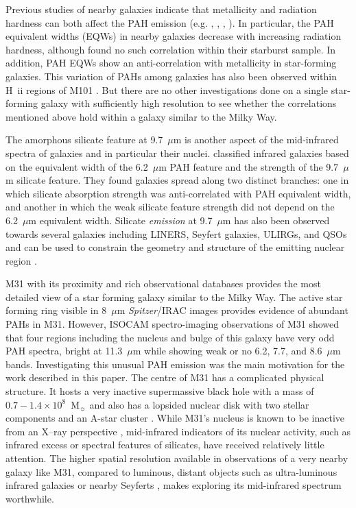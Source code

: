\documentclass[useAMS,usenatbib,a4paper]{mn2e}
\begin{document}
Previous studies of nearby galaxies indicate that metallicity and radiation hardness can both affect the PAH emission (e.g. \citealt{Madden:00}, \citealt{Beirao:06}, \citealt{Engelbracht_2008}, \citealt{Munoz:09}). In particular, the PAH equivalent widths (EQWs) in nearby galaxies decrease with increasing radiation hardness, although \citet{Brandl2006} found no such correlation within their starburst sample. In addition, PAH EQWs show an anti-correlation with metallicity in star-forming galaxies. This variation of PAHs among galaxies has also been observed within H~{\sc ii} regions 
of M101 \citep{Gordon:2008lr}. But there are no other investigations done on a single star-forming galaxy with sufficiently high resolution to see whether the correlations mentioned above hold within a galaxy similar to the Milky Way.

The amorphous silicate feature at 9.7~$\mu$m is another aspect of the mid-infrared spectra of galaxies and in particular their nuclei.  \citet{Spoon2007} 
classified infrared galaxies based on the equivalent width of the 6.2~$\mu$m PAH feature and the strength of the 9.7~$\mu$m silicate feature. 
They  found galaxies spread along two distinct branches: one in which silicate absorption strength was anti-correlated with PAH
equivalent width, and another in which the weak silicate feature strength did not depend on the 6.2~$\mu$m equivalent width.
Silicate {\em emission} at 9.7~$\mu$m has also been observed  towards several galaxies including LINERS, Seyfert galaxies, ULIRGs, and QSOs \citep[e.g.][]{Sturm2005, Hao2005, Spoon2007, Mason2012} 
and can be used to constrain the geometry and structure of the emitting nuclear region \citep{Mason2009}.



M31 with its proximity \citep[$785\pm25$ kpc; ][]{Mcc2005} and rich observational databases provides the most detailed view of a star forming galaxy similar 
to the Milky Way. The active star forming ring visible in 8~$\mu$m  {\em Spitzer}/IRAC images \citep{Barmby2006lr} provides evidence of abundant PAHs in M31. 
However, ISOCAM spectro-imaging observations of M31\citep{1998Cesarsky} showed that four regions including the nucleus and bulge 
of this galaxy have very odd PAH spectra, bright at 11.3~$\mu$m while showing weak or no  6.2, 7.7, and 8.6~$\mu$m bands. 
Investigating this unusual PAH emission was the main motivation for the work described in this paper. 
The centre of M31 has a complicated physical structure. It hosts a very inactive supermassive black hole with a mass of 
$0.7-1.4 \times 10^8$~M$_{\sun}$ \citep{Bacon2001, Bender2005} and also has a lopsided nuclear disk  with two stellar 
components \citep{Lauer1993} and an A-star cluster \citep{Bender2005}. While M31's nucleus is known to be inactive from an 
X--ray perspective \citep{Li2011}, mid-infrared indicators of its nuclear activity, such
as infrared excess or spectral features of silicates,  have received relatively little attention. 
The higher spatial resolution available in observations of  a very nearby galaxy like M31, compared to 
luminous, distant objects such as ultra-luminous infrared galaxies \citep{Spoon2007} or nearby Seyferts \citep{Mason2009},
makes exploring its mid-infrared spectrum worthwhile.
\end{document}
